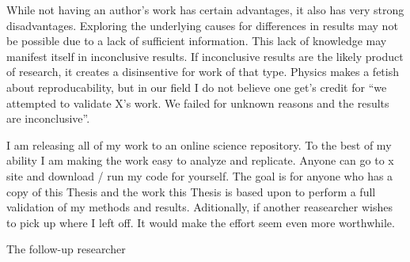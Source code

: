 While not having an author's work has certain advantages, it also has very strong disadvantages.  Exploring the underlying causes for differences in results may not be possible due to a lack of sufficient information.  This lack of knowledge may manifest itself in inconclusive results.  If inconclusive results are the likely product of research, it creates a disinsentive for work of that type.  Physics makes a fetish about reproducability, but in our field I do not believe one get's credit for ``we attempted to validate X's work.  We failed for unknown reasons and the results are inconclusive''.

I am releasing all of my work to an online science repository.  To the best of my ability I am making the work easy to analyze and replicate.  Anyone can go to x site and download / run my code for yourself.  The goal is for anyone who has a copy of this Thesis and the work this Thesis is based upon to perform a full validation of my methods and results.  Aditionally, if another reasearcher wishes to pick up where I left off.  It would make the effort seem even more worthwhile. 

The follow-up researcher

